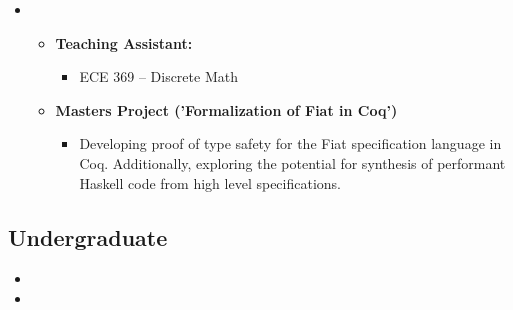 \documentclass[10pt,a4paper,sans]{moderncv}        %
\begin{document}
\begin{itemize}

\item{}

  \begin{itemize}
  \item{\textbf{Teaching Assistant:}}
    \begin{itemize}
    \item ECE 369 -- Discrete Math
    \end{itemize}
  \item{
      \textbf{Masters Project ('Formalization of Fiat in Coq')}
      \begin{itemize}
      \item \parbox{0.75\linewidth}{Developing proof of type safety
          for the Fiat specification language in Coq. Additionally,
          exploring the potential for synthesis of performant Haskell
          code from high level specifications. }
      \end{itemize}
    }
  \end{itemize}





\end{itemize}

\subsection{Undergraduate}

\vspace{3pt}

\begin{itemize}

\item{}

\item{}  %

\end{itemize}
\end{document}
